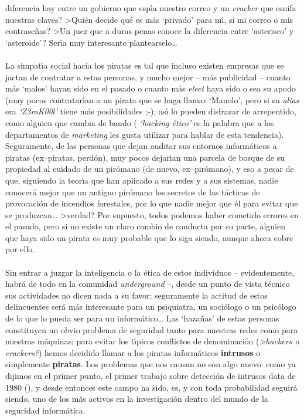 diferencia hay entre un gobierno que esp\'{\i}a nuestro correo y un {\it
cracker} que esnifa nuestras claves? >Qui\'en decide qu\'e es m\'as `privado'
para m\'{\i}, si mi correo o mis contrase\~nas? >Un juez que a duras penas
conoce la diferencia entre `asterisco' y `asteroide'? Ser\'{\i}a muy interesante
plantearselo\ldots\\
\\La simpat\'{\i}a social hacia los piratas es tal que incluso existen empresas 
que se jactan de contratar a estas personas, y mucho mejor -- m\'as publicidad 
-- cuanto m\'as `malos' hayan sido en el pasado o cuanto m\'as {\it eleet} haya 
sido o sea su
apodo (muy pocos contratar\'{\i}an a un pirata que se haga llamar `Manolo', pero
si su {\it alias} era {\it `Z3roK00l'} tiene m\'as posibilidades ;-); as\'{\i}
lo pueden disfrazar de arrepentido, como alguien que cambia de bando ({\it 
`hacking \'etico'} es la palabra que a los departamentos de {\it marketing} les
gusta utilizar para hablar de esta tendencia). Seguramente, de las personas que 
dejan auditar
sus entornos inform\'aticos a piratas (ex--piratas, perd\'on), muy pocos 
dejar\'{\i}an una parcela de bosque de su propiedad al cuidado de un pir\'omano 
(de nuevo, ex--pir\'omano), y eso a pesar de que, siguiendo la teor\'{\i}a que 
han aplicado a sus redes y a sus sistemas, nadie conocer\'a mejor que un 
antiguo pir\'omano los secretos de las t\'acticas de provocaci\'on de incendios 
forestales, por lo que nadie mejor que \'el para evitar que se produzcan\ldots 
>verdad? Por supuesto, todos podemos haber cometido errores en el pasado, pero
si no existe un claro cambio de conducta por su parte, alguien que haya sido
un pirata es muy probable que lo siga siendo, aunque ahora cobre por ello.\\
\\Sin entrar a juzgar la inteligencia o la \'etica de estos individuos
-- evidentemente, habr\'a de todo en la comunidad {\it underground} --, 
desde un punto de vista t\'ecnico sus actividades no dicen nada a su favor; 
seguramente la 
actitud de estos delincuentes ser\'a m\'as interesante para un psiquiatra, un
soci\'ologo o un psic\'ologo de lo que lo pueda ser para un inform\'atico\ldots 
Las `haza\~nas' de estas personas constituyen un obvio problema de seguridad 
tanto para nuestras redes como para nuestras m\'aquinas; para evitar los 
t\'{\i}picos conflictos de denominaci\'on ({\it >hackers o crackers?}) hemos
decidido llamar a los piratas inform\'aticos {\bf intrusos} o 
simplemente {\bf piratas}. Los problemas que nos causan no son algo nuevo: como
ya dijimos en el primer punto, el primer trabajo sobre detecci\'on de intrusos 
data de 1980 (\cite{kn:and80}), y desde entonces este campo ha sido, es, y con 
toda probabilidad seguir\'a siendo, uno de los m\'as activos en la 
investigaci\'on dentro del mundo de la seguridad inform\'atica.
